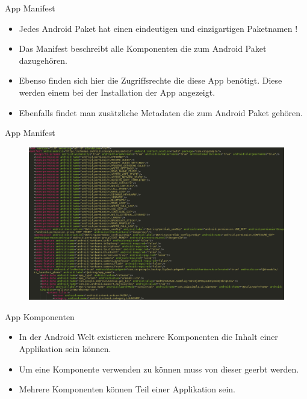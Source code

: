 \documentclass{beamer}
\begin{document}
\begin{frame}{App Manifest}
\begin{itemize}
\item Jedes Android Paket hat einen eindeutigen und einzigartigen Paketnamen !
\item Das Manifest beschreibt alle Komponenten die zum Android Paket dazugehören.
\item Ebenso finden sich hier die Zugriffsrechte die diese App benötigt. Diese werden einem
bei der Installation der App angezeigt.
\item Ebenfalls findet man zusätzliche Metadaten die zum Android Paket gehören.
\end{itemize}
\end{frame}

\begin{frame}{App Manifest}
\begin{figure}[hb]
 \centering
 \includegraphics[scale=0.23]{manifest}
\end{figure}
\end{frame}

\begin{frame}{App Komponenten}
\begin{itemize}
\item In der Android Welt existieren mehrere Komponenten die Inhalt einer Applikation sein können.
\item Um eine Komponente verwenden zu können muss von dieser geerbt werden.
\item Mehrere Komponenten können Teil einer Applikation sein.
\end{itemize}
\end{frame}
\end{document}
